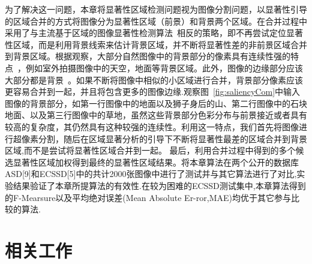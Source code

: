 \par
为了解决这一问题，本章将显著性区域检测问题视为图像分割问题，以显著性引导的区域合并的方式将图像分为显著性区域（前景）和背景两个区域。在合并过程中采用了与主流基于区域的图像显著性检测算法~\cite{Achanta08,ChengPAMI,ufo,Yan2014Hierarchical}相反的策略，即不再尝试定位显著性区域，而是利用背景线索来估计背景区域，并不断将显著性差的非前景区域合并到背景区域。根据观察，大部分自然图像中的背景部分的像素具有连续性强的特点~\cite{huamiao}，例如室外拍摄图像中的天空，地面等背景区域。此外，图像的边缘部分应该大部分都是背景~\cite{backgroundPrior}。如果不断将图像中相似的小区域进行合并，背景部分像素应该更容易合并到一起，并且将包含更多的图像边缘.观察图~\ref{fig:saliencyCom}中输入图像的背景部分，如第一行图像中的地面以及狮子身后的山、第二行图像中的石块地面、以及第三行图像中的草地，虽然这些背景部分色彩分布与前景接近或者具有较高的复杂度，其仍然具有这种较强的连续性。利用这一特点，我们首先将图像进行超像素分割，随后在区域显著分析的引导下不断将显著性最差的区域合并到背景区域,而不是尝试将显著性区域合并到一起。 最后，利用合并过程中得到的多个候选显著性区域加权得到最终的显著性区域结果。将本章算法在两个公开的数据库ASD[9]和ECSSD[5]中的共计2000张图像中进行了测试并与其它算法进行了对比,实验结果验证了本章所提算法的有效性.在较为困难的ECSSD测试集中,本章算法得到的F-Mearsure以及平均绝对误差(Mean Absolute Er-ror,MAE)均优于其它参与比较的算法.

\section{相关工作}
\label{sec:relatedWorks}
